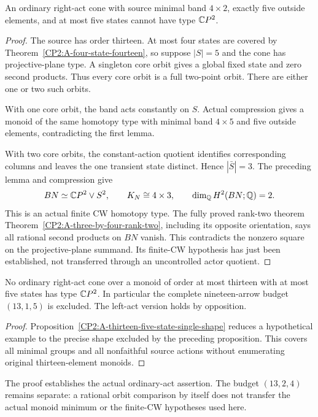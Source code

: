 \begin{proposition}
\label{CP2:A-four-row-five-outside-five-state}
An ordinary right-act cone with source minimal band
$4\times2$, exactly five outside elements, and at most
five states cannot have type $\mathbb{C}P^2$.
\end{proposition}
\begin{proof}
The source has order thirteen. At most four states are
covered by Theorem~\ref{CP2:A-four-state-fourteen}, so suppose
$|S|=5$ and the cone has projective-plane type. A singleton
core orbit gives a global fixed state and zero second
products. Thus every core orbit is a full two-point orbit.
There are either one or two such orbits.

With one core orbit, the band acts constantly on $S$.
Actual compression gives a monoid of the same homotopy
type with minimal band $4\times5$ and five outside
elements, contradicting the first lemma.

With two core orbits, the constant-action quotient
identifies corresponding columns and leaves the one
transient state distinct. Hence $|\bar S|=3$. The preceding
lemma and compression give
\[
 BN\simeq\mathbb{C}P^2\vee S^2,
 \qquad K_N\cong4\times3,
 \qquad\dim_{\mathbb Q}H^2(BN;\mathbb Q)=2.
\]
This is an actual finite CW homotopy type. The fully proved
rank-two theorem
Theorem~\ref{CP2:A-three-by-four-rank-two}, including its
opposite orientation, says all rational second products
on $BN$ vanish. This contradicts the nonzero square on
the projective-plane summand. Its finite-CW hypothesis
has just been established, not transferred through an
uncontrolled actor quotient.
\end{proof}

\begin{theorem}
\label{CP2:A-oriented-nineteen-thirteen-one-five}
No ordinary right-act cone over a monoid of order at most
thirteen with at most five states has type $\mathbb{C}P^2$.
In particular the complete nineteen-arrow budget
$(13,1,5)$ is excluded. The left-act version holds by
opposition.
\end{theorem}
\begin{proof}
Proposition~\ref{CP2:A-thirteen-five-state-single-shape}
reduces a hypothetical example to the precise shape
excluded by the preceding proposition. This covers all
minimal groups and all nonfaithful source actions without
enumerating original thirteen-element monoids.
\end{proof}

\begin{remark*}
The proof establishes the actual ordinary-act assertion.
The budget $(13,2,4)$ remains separate: a rational orbit
comparison by itself does not transfer the actual monoid
minimum or the finite-CW hypotheses used here.
\end{remark*}
